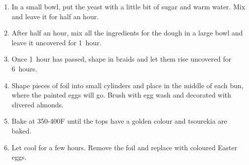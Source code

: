 \begin{enumerate}
    \item In a small bowl, put the yeast with a little bit of sugar and warm water. Mix and leave it for half an hour.
    \item After half an hour, mix all the ingredients for the dough in a large bowl and leave it uncovered for 1~hour.
    \item Once 1~hour has passed, shape in braids and let them rise uncovered for 6~hours.
    \item Shape pieces of foil into small cylinders and place in the middle of each bun, where the painted eggs will go. Brush with egg wash and decorated with slivered almonds.
    \item Bake at 350-400\degree F until the tops have a golden colour and tsourekia are baked.
    \item Let cool for a few hours. Remove the foil and replace with coloured Easter eggs.
\end{enumerate}

